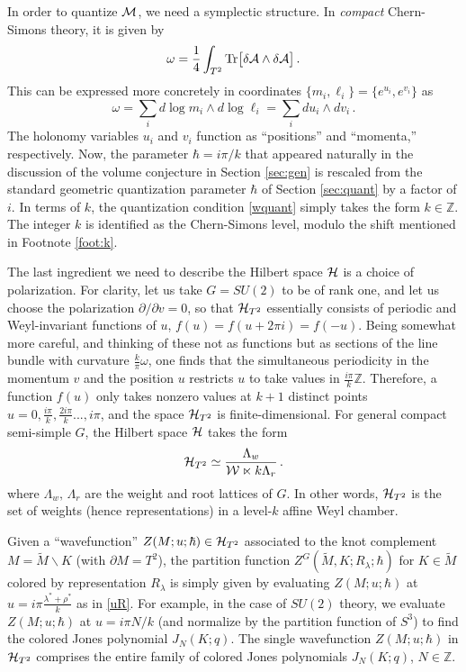 \documentclass[letterpaper,12pt]{article}
\numberwithin{equation}{section}
\newcommand{\be}{\begin{equation}}
\newcommand{\ee}{\end{equation}}
\newcommand{\pd}{\partial}
\newcommand{\Tr}{{\rm Tr}}
\newcommand{\bs}{\backslash}
\newcommand{\Z}{{\mathbb{Z}}}
\newcommand{\CA}{{\cal A}}
\newcommand{\CH}{{\cal H}}
\newcommand{\CM}{{\cal M}}
\newcommand{\CW}{{\cal W}}
\renewcommand{\=}{\;=\;}
\begin{document}
In order to quantize $\CM$, we need a symplectic structure.
In \emph{compact} Chern-Simons theory, it is given by
%
\be \omega = \frac14 \int_{T^2} \Tr\big[\delta\CA\wedge \delta\CA\big]\,. \label{w0} \ee
%
This can be expressed more concretely in coordinates $\{m_i,\ell_i\}=\{e^{u_i},e^{v_i}\}$ as
%
\be \omega = \sum_i d\log m_i\wedge d\log \ell_i = \sum_idu_i\wedge dv_i\,. \ee
%
The holonomy variables $u_i$ and $v_i$ function as ``positions'' and ``momenta,'' respectively.
Now, the parameter $\hbar=i\pi/k$ that appeared naturally in the discussion of the volume conjecture in Section \ref{sec:gen} is rescaled from the standard geometric quantization parameter $\hbar$ of Section \ref{sec:quant} by a factor of $i$. In terms of $k$, the quantization condition \eqref{wquant} simply takes the form $k\in\Z$. The integer $k$ is identified as the Chern-Simons level, modulo the shift mentioned in Footnote \ref{foot:k}.


The last ingredient we need to describe the Hilbert space $\CH$ is a choice of polarization. For clarity, let us take $G=SU(2)$ to be of rank one, and let us choose the polarization $\pd/\pd v = 0$, so that $\CH_{T^2}$ essentially consists of periodic and Weyl-invariant functions of $u$, $f(u) = f(u+2\pi i) = f(-u)$. Being somewhat more careful, and thinking of these not as functions but as sections of the line bundle with curvature $\frac{k}{\pi}\omega$, one finds that the simultaneous periodicity in the momentum $v$ and the position $u$ restricts $u$ to take values in $\frac{i\pi}{k}\Z$. Therefore, a function $f(u)$ only takes nonzero values at $k+1$ distinct points $u=0,\frac{i\pi}{k},\frac{2 i\pi}{k}...,i\pi$, and the space $\CH_{T^2}$ is finite-dimensional. For general compact semi-simple $G$, the Hilbert space $\CH$ takes the form \cite{EMSS, axelrod-witten}
%
\be \CH_{T^2} \simeq \frac{\Lambda_w}{\CW\ltimes k\Lambda_r}\,. \ee
%
where $\Lambda_w,\,\Lambda_r$ are the weight and root lattices of $G$. In other words, $\CH_{T^2}$ is the set of weights (hence representations) in a level-$k$ affine Weyl chamber.

Given a ``wavefunction'' $Z(M;u;\hbar)\in\CH_{T^2}$ associated to the knot complement $M=\widetilde{M}\bs K$
(with $\pd M=T^2$), the partition function $Z^G(\widetilde{M},K;R_\lambda;\hbar)$
for $K\in \widetilde{M}$ colored by representation $R_\lambda$ is simply given by
evaluating $Z(M;u;\hbar)$ at $u=i\pi\frac{\lambda^*+\rho^*}{k}$ as in \eqref{uR}.
For example, in the case of $SU(2)$ theory, we evaluate $Z(M;u;\hbar)$ at $u = i\pi N/k$
(and normalize by the partition function of $S^3$) to find the colored Jones polynomial $J_N(K;q)$.
The single wavefunction $Z(M;u;\hbar)$ in $\CH_{T^2}$
comprises the entire family of colored Jones polynomials $J_N(K;q)$, $N\in\Z$.
\end{document}
